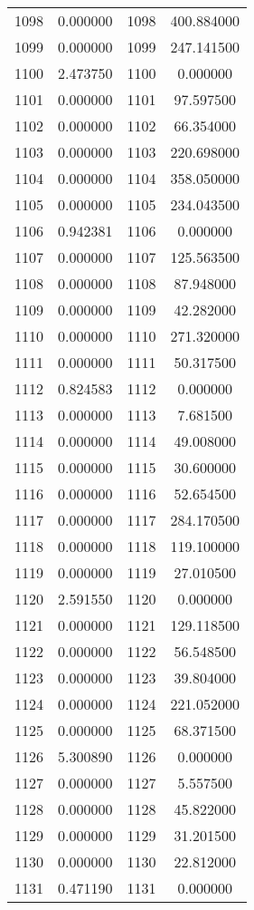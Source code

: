 \documentclass[12pt]{article}
\begin{document}
\begin{longtable}{@{}cccc@{}}
1098 & 0.000000 & 1098 & 400.884000 \\
1099 & 0.000000 & 1099 & 247.141500 \\
1100 & 2.473750 & 1100 & 0.000000 \\
1101 & 0.000000 & 1101 & 97.597500 \\
1102 & 0.000000 & 1102 & 66.354000 \\
1103 & 0.000000 & 1103 & 220.698000 \\
1104 & 0.000000 & 1104 & 358.050000 \\
1105 & 0.000000 & 1105 & 234.043500 \\
1106 & 0.942381 & 1106 & 0.000000 \\
1107 & 0.000000 & 1107 & 125.563500 \\
1108 & 0.000000 & 1108 & 87.948000 \\
1109 & 0.000000 & 1109 & 42.282000 \\
1110 & 0.000000 & 1110 & 271.320000 \\
1111 & 0.000000 & 1111 & 50.317500 \\
1112 & 0.824583 & 1112 & 0.000000 \\
1113 & 0.000000 & 1113 & 7.681500 \\
1114 & 0.000000 & 1114 & 49.008000 \\
1115 & 0.000000 & 1115 & 30.600000 \\
1116 & 0.000000 & 1116 & 52.654500 \\
1117 & 0.000000 & 1117 & 284.170500 \\
1118 & 0.000000 & 1118 & 119.100000 \\
1119 & 0.000000 & 1119 & 27.010500 \\
1120 & 2.591550 & 1120 & 0.000000 \\
1121 & 0.000000 & 1121 & 129.118500 \\
1122 & 0.000000 & 1122 & 56.548500 \\
1123 & 0.000000 & 1123 & 39.804000 \\
1124 & 0.000000 & 1124 & 221.052000 \\
1125 & 0.000000 & 1125 & 68.371500 \\
1126 & 5.300890 & 1126 & 0.000000 \\
1127 & 0.000000 & 1127 & 5.557500 \\
1128 & 0.000000 & 1128 & 45.822000 \\
1129 & 0.000000 & 1129 & 31.201500 \\
1130 & 0.000000 & 1130 & 22.812000 \\
1131 & 0.471190 & 1131 & 0.000000 \\

\end{longtable}
\end{document}
